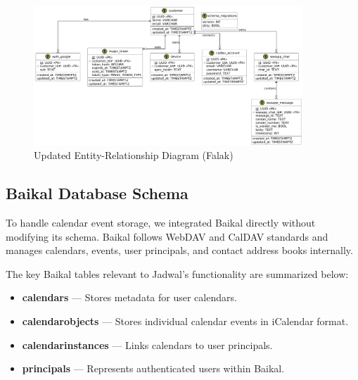 \begin{figure}[!h]
    \centering
    \includegraphics[width=0.9\textwidth]{images/docs/diagrams/er/new-database/Updated Falak ERD.png}
    \caption{Updated Entity-Relationship Diagram (Falak)}
    \label{fig:updated-er-diagram}
\end{figure}


\subsection{Baikal Database Schema}

To handle calendar event storage, we integrated Baikal directly without modifying its schema. Baikal follows WebDAV and CalDAV standards and manages calendars, events, user principals, and contact address books internally.

The key Baikal tables relevant to Jadwal's functionality are summarized below:

\begin{itemize}
    \item \textbf{calendars} — Stores metadata for user calendars.
    \item \textbf{calendarobjects} — Stores individual calendar events in iCalendar format.
    \item \textbf{calendarinstances} — Links calendars to user principals.
    \item \textbf{principals} — Represents authenticated users within Baikal.
\end{itemize}

